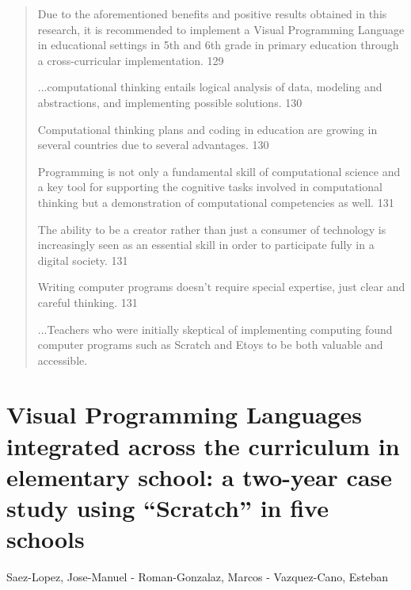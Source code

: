 \documentclass[12pt]{extarticle}
\begin{document}
\begin{quote}
    
    Due to the aforementioned benefits and positive results obtained in this research, it is recommended to implement a Visual Programming Language in educational settings in 5th and 6th grade in primary education through a cross-curricular implementation. 	129
    
    ...computational thinking entails logical analysis of data, modeling and abstractions, and implementing possible solutions.	130
    
    Computational thinking plans and coding in education are growing in several countries due to several advantages. 130
    
    Programming is not only a fundamental skill of computational science and a key tool for supporting the cognitive tasks involved in computational thinking but a demonstration of computational competencies as well. 131
    
    The ability to be a creator rather than just a consumer of technology is increasingly seen as an essential skill in order to participate fully in a digital society. 131
    
    Writing computer programs doesn’t require special expertise, just clear and careful thinking. 131
    
    ...Teachers who were initially skeptical of implementing computing found computer programs such as Scratch and Etoys to be both valuable and accessible. 
\end{quote}

\section{Visual Programming Languages integrated across the curriculum in elementary school: a two-year case study using “Scratch” in five schools}
Saez-Lopez, Jose-Manuel - Roman-Gonzalaz, Marcos - Vazquez-Cano, Esteban 
\end{document}
